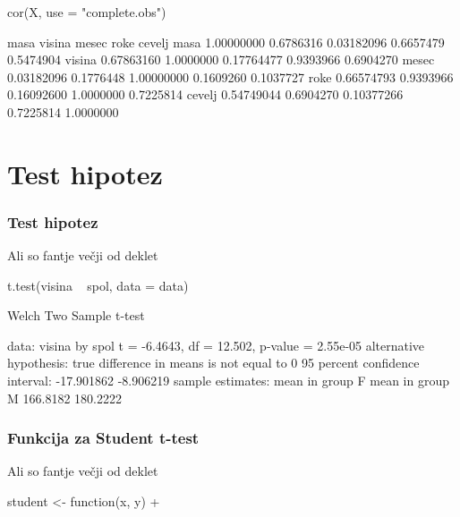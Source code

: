 \begin{frame}[fragile]
\frametitle{}
\begin{Schunk}
\begin{Sinput}
 cor(X, use = "complete.obs")
\end{Sinput}
\begin{Soutput}
             masa    visina      mesec      roke    cevelj
masa   1.00000000 0.6786316 0.03182096 0.6657479 0.5474904
visina 0.67863160 1.0000000 0.17764477 0.9393966 0.6904270
mesec  0.03182096 0.1776448 1.00000000 0.1609260 0.1037727
roke   0.66574793 0.9393966 0.16092600 1.0000000 0.7225814
cevelj 0.54749044 0.6904270 0.10377266 0.7225814 1.0000000
\end{Soutput}
\end{Schunk}
\end{frame}


\section{Test hipotez}

\begin{frame}[fragile]
\frametitle{Test hipotez}
Ali so fantje večji od deklet
\begin{Schunk}
\begin{Sinput}
 t.test(visina ~ spol, data = data)
\end{Sinput}
\begin{Soutput}
	Welch Two Sample t-test

data:  visina by spol 
t = -6.4643, df = 12.502, p-value = 2.55e-05
alternative hypothesis: true difference in means is not equal to 0 
95 percent confidence interval:
 -17.901862  -8.906219 
sample estimates:
mean in group F mean in group M 
       166.8182        180.2222 
\end{Soutput}
\end{Schunk}
\end{frame}


\begin{frame}[fragile]
\frametitle{Funkcija za Student t-test}
Ali so fantje večji od deklet
\begin{Schunk}
\begin{Sinput}
 student <- function(x, y) {
+ }
\end{Sinput}
\end{Schunk}
\end{frame}


